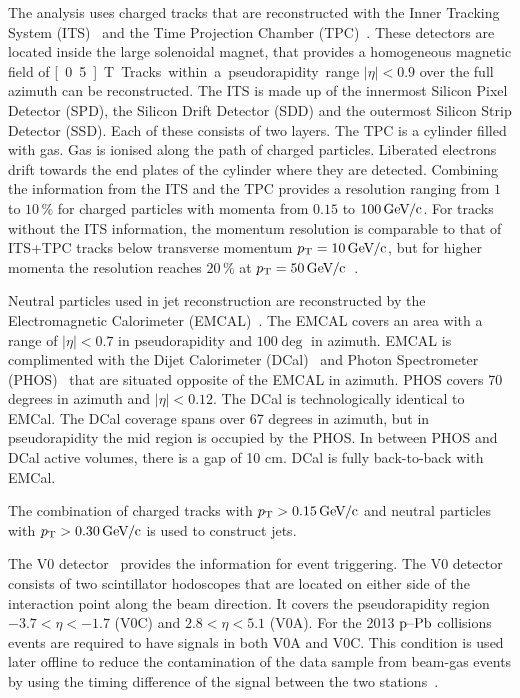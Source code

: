 The analysis uses charged tracks that are reconstructed with the Inner Tracking System (ITS)~\cite{aliceITS} and the Time Projection Chamber (TPC)~\cite{aliceTPC}. These detectors are located inside the large solenoidal magnet, that provides a homogeneous magnetic field of \unit[0.5]{T}. Tracks within a pseudorapidity range $|\eta| < 0.9$ over the full azimuth can be reconstructed. The ITS is made up of the innermost Silicon Pixel Detector (SPD), the Silicon Drift Detector (SDD) and the outermost Silicon Strip Detector (SSD). Each of these consists of two layers. The TPC is a cylinder filled with gas. Gas is ionised along the path of charged particles. Liberated electrons drift towards the end plates of the cylinder where they are detected. Combining the information from the ITS and the TPC provides a resolution ranging from $1$ to $10\,\%$ for charged particles with momenta from $0.15$ to $\unit[100]{\GeVc}$. For tracks without the ITS information, the momentum resolution is comparable to that of ITS+TPC tracks below transverse momentum $\pt{} = \unit[10]{\GeVc}$, but for higher momenta the resolution reaches $20\,\%$ at $\pt{} = \unit[50]{\GeVc}$~\cite{alicePerformance,aliceBackgroundFluctuation}. 

Neutral particles used in jet reconstruction are reconstructed by the Electromagnetic Calorimeter (EMCAL)~\cite{Cortese:2008zza}. The EMCAL covers an area with a range of $|\eta| < 0.7$  in pseudorapidity and $ 100 \deg $ in azimuth. EMCAL is complimented with the Dijet Calorimeter (DCal)~\cite{DCAL} and Photon Spectrometer (PHOS)~\cite{PHOS} that are situated opposite of the EMCAL in azimuth. PHOS covers 70 degrees in azimuth and $\left| \eta \right| < 0.12$. The DCal is technologically identical to EMCal. The DCal coverage spans over 67 degrees in azimuth, but in pseudorapidity the mid region is occupied by the PHOS. In between PHOS and DCal active volumes, there is a gap of 10 cm. DCal is fully back-to-back with EMCal.

The combination of charged tracks with  $\pt{} > \unit[0.15]{\GeVc}$ and neutral particles with $\pt{} > \unit[0.30]{\GeVc}$ is used to construct jets. 

The V0 detector~\cite{forwarddetectorsTdr} provides the information for event triggering. The V0 detector consists of two scintillator hodoscopes that are located on either side of the interaction point along the beam direction. It covers the pseudorapidity region $-3.7 < \eta < -1.7$ (V0C) and $2.8 < \eta < 5.1$ (V0A). For the 2013 $\mbox{p--Pb}$ collisions events are required to have signals in both V0A and V0C. This condition is used later offline to reduce the contamination of the data sample from beam-gas events by using the timing difference of the signal between the two stations~\cite{alicePerformance}.

